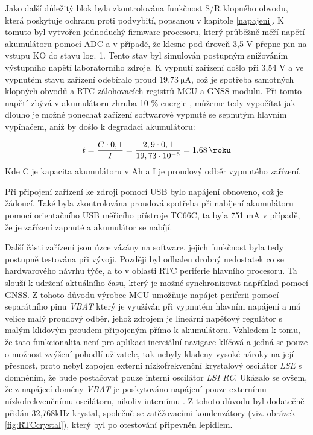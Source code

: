 Jako další důležitý blok byla zkontrolována funkčnost S/R klopného obvodu, která poskytuje ochranu proti podvybití, popsanou v kapitole \ref{napajeni}. K tomuto byl vytvořen jednoduchý firmware procesoru, který průběžně měří napětí akumulátoru pomocí \ac{ADC} a v případě, že klesne pod úroveň 3,5 V přepne pin na vstupu KO do stavu log. 1. Tento stav byl simulován postupným snižováním výstupního napětí laboratorního zdroje. K vypnutí zařízení došlo při 3,54 V a ve vypnutém stavu zařízení odebíralo proud $ \SI{19,73}{\micro\ampere} $, což je spotřeba samotných klopných obvodů a \ac{RTC} zálohovacích registrů \ac{MCU} a \ac{GNSS} modulu. Při tomto napětí zbývá v akumulátoru zhruba 10 \% energie \cite{Cheruiyot2022914}, můžeme tedy vypočítat jak dlouho je možné ponechat zařízení softwarově vypnuté se sepnutým hlavním vypínačem, aniž by došlo k degradaci akumulátoru:

\begin{equation}
t = \dfrac{C\cdot 0,1}{I}=\dfrac{2,9\cdot 0,1}{19,73 \cdot 10^{-6}}= \SI{1.68}{\roku}
\end{equation}
Kde C je kapacita akumulátoru v Ah a I je proudový odběr vypnutého zařízení.

Při připojení zařízení ke zdroji pomocí \ac{USB} bylo napájení obnoveno, což je žádoucí. Také byla zkontrolována proudová spotřeba při nabíjení akumulátoru pomocí orientačního \ac{USB} měřicího přístroje TC66C, ta byla 751 mA v případě, že je zařízení zapnuté a akumulátor se nabíjí.

Další části zařízení jsou úzce vázány na software, jejich funkčnost byla tedy postupně testována při vývoji. Později byl odhalen drobný nedostatek co se hardwarového návrhu týče, a to v oblasti \ac{RTC} periferie hlavního procesoru. Ta slouží k udržení aktuálního času, který je možné synchronizovat například pomocí \ac{GNSS}. Z tohoto důvodu výrobce \ac{MCU} umožňuje napájet periferii pomocí separátního pinu \emph{VBAT} který je využíván při vypnutém hlavním napájení a má velice malý proudový odběr, jehož zdrojem je lineární napěťový regulátor s malým klidovým proudem připojeným přímo k akumulátoru. Vzhledem k tomu, že tato funkcionalita není pro aplikaci inerciální navigace klíčová a jedná se pouze o možnost zvýšení pohodlí uživatele, tak nebyly kladeny vysoké nároky na její přesnost, proto nebyl zapojen externí nízkofrekvenční krystalový oscilátor \emph{LSE} s domněním, že bude postačovat pouze interní oscilátor \emph{LSI RC}. Ukázalo se ovšem, že z napájecí domény \emph{VBAT} je poskytováno napájení pouze externímu nízkofrekvenčnímu oscilátoru, nikoliv internímu \cite{csdGtKJDMSdbwJ9r}. Z tohoto důvodu byl dodatečně přidán 32,768kHz krystal, společně se zatěžovacími kondenzátory (viz. obrázek \ref{fig:RTCcrystal}), který byl po otestování připevněn lepidlem.


